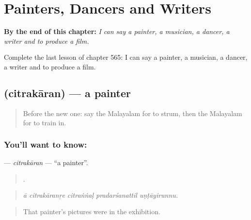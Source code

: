 
\chapter{Painters, Dancers and Writers}
\label{ch:ml-painters-dancers-and-writers}

\begin{chapteropening}
\textbf{By the end of this chapter:} \emph{I can say a painter, a musician, a dancer, a writer and to produce a film.}

Complete the last lesson of chapter 565: I can say a painter, a musician, a dancer, a writer and to produce a film.
\end{chapteropening}

\section[\texorpdfstring{\ml{ചിത്രകാരൻ} (citrakāran)}{ചിത്രകാരൻ (citrakāran)}]{ (citrakāran) — a painter}

\label{lesson:ML-C565-citrakaran}



\begin{quote}
Before the new one: say the Malayalam for to strum, then the Malayalam for to train in.
\end{quote}

\subsection*{You'll want to know: }
\textbf{} — \emph{citrakāran} — \textquotedblleft{}a painter\textquotedblright{}.

\begin{quote}
    .
\end{quote}

\begin{quote}
\emph{ā citrakāranṟe citraṅṅaḷ pradarśanattil uṇṭāyirunnu.}
\end{quote}

\begin{quote}
That painter's pictures were in the exhibition.
\end{quote}

